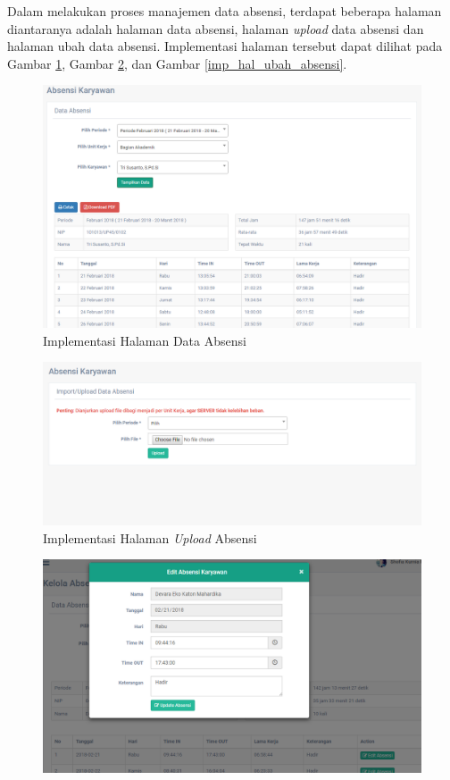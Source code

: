 \begin{enumerate}
            Dalam melakukan proses manajemen data absensi, terdapat beberapa halaman diantaranya adalah halaman data absensi, halaman \emph{upload} data absensi dan halaman ubah data absensi. Implementasi halaman tersebut dapat dilihat pada Gambar \ref{imp_hal_data_absensi}, Gambar \ref{imp_hal_upload_absensi}, dan Gambar \ref{imp_hal_ubah_absensi}.
	        \begin{figure}[H]
                \centering
                \includegraphics[width=15cm]{gambar/halaman/halaman-data-absensi}
                \caption{Implementasi Halaman Data Absensi}
                \label{imp_hal_data_absensi}
            \end{figure}
            \begin{figure}[H]
                \centering
                \includegraphics[width=13cm]{gambar/halaman/halaman-upload-absensi}
                \caption{Implementasi Halaman \emph{Upload} Absensi}
                \label{imp_hal_upload_absensi}
            \end{figure}
            \begin{figure}[H]
                \centering
                \includegraphics[width=14cm]{gambar/halaman/halaman-kelola-absensi}

\end{figure}
\end{enumerate}
